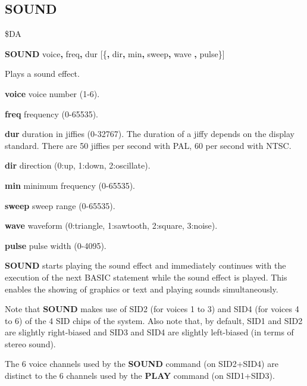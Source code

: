 \subsection{SOUND}
\begin{description}[leftmargin=2cm,style=nextline]
\item [Token:] \$DA
\item [Format:] {\bf SOUND} voice{\bf,} freq{\bf,} dur
                [\{{\bf,} dir{\bf,} min{\bf,} sweep{\bf,} wave
                {\bf,} pulse\}]

\item [Usage:] Plays a sound effect.

               {\bf voice} voice number (1-6).

               {\bf freq} frequency (0-65535).

               {\bf dur} duration in jiffies (0-32767).
                The duration of a jiffy depends on the display standard.
                There are 50 jiffies per second with PAL, 60 per second with NTSC.

               {\bf dir} direction (0:up, 1:down, 2:oscillate).

               {\bf min} minimum frequency (0-65535).

               {\bf sweep} sweep range (0-65535).

               {\bf wave} waveform (0:triangle, 1:sawtooth, 2:square,
               3:noise).

               {\bf pulse} pulse width (0-4095).

\item [Remarks:] {\bf SOUND} starts playing the sound
               effect and immediately continues with the execution
               of the next BASIC statement while the sound effect
               is played. This enables the showing of graphics or text
               and playing sounds simultaneously.

               Note that {\bf SOUND} makes use of SID2 (for voices 1 to 3) and SID4 (for voices 4 to 6)
               of the 4 SID chips of the system. Also note that, by default, SID1 and SID2 are slightly
               right-biased and SID3 and SID4 are slightly left-biased (in terms of stereo sound).

               The 6 voice channels used by the {\bf SOUND} command
               (on SID2+SID4) are distinct to the 6 channels used by
               the {\bf PLAY} command (on SID1+SID3).



\end{description}
